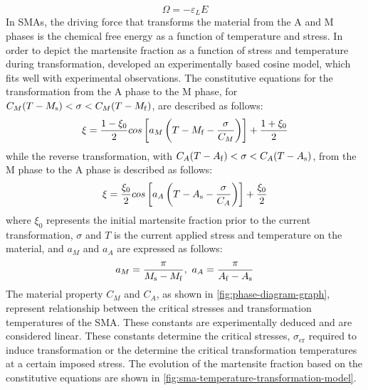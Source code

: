 \begin{equation}
  \label{eq:tensor-youngsmodulus}
  \Omega = -\varepsilon_L E
\end{equation}
In SMAs, the driving force that transforms the material from the A and M phases is the chemical free energy as a function of temperature and stress. In order to depict the martensite fraction as a function of stress and temperature during transformation, \cite{liangConstitutiveModelingShape1990a} developed an experimentally based cosine model, which fits well with experimental observations. The constitutive equations for the transformation from the A phase to the M phase, for $C_M(T-M_\mathrm{s})<\sigma<C_M(T-M_\mathrm{f})$, are described as follows:
\begin{equation}
  \label{eq:liang-MA}
  \xi=\frac{1-\xi_0}{2}cos\left[a_M\left(T-M_\mathrm{f}-\frac{\sigma}{C_M}\right)\right]+\frac{1+\xi_0}{2}
\end{equation}
while the reverse transformation, with $C_A(T-A_\mathrm{f})<\sigma<C_A(T-A_\mathrm{s})$, from the M phase to the A phase is described as follows:
\begin{equation}
  \label{eq:liang-AM}
  \xi=\frac{\xi_0}{2}cos\left[a_A\left(T-A_\mathrm{s}-\frac{\sigma}{C_A}\right)\right]+\frac{\xi_0}{2}
\end{equation}
where $\xi_0$ represents the initial martensite fraction prior to the current transformation, $\sigma$ and $T$ is the current applied stress and temperature on the material, and $a_M$ and $a_A$ are expressed as follows:
\begin{equation}
  \label{eq:aM-aA}
  a_M=\frac{\pi}{M_\mathrm{s}-M_\mathrm{f}},~a_A=\frac{\pi}{A_\mathrm{f}-A_\mathrm{s}}
\end{equation}
The material property $C_M$ and $C_A$, as shown in \cref{fig:phase-diagram-graph}, represent relationship between the critical stresses and transformation temperatures of the SMA. These constants are experimentally deduced and are considered linear. These constants determine the critical stresses, $\sigma_\mathrm{cr}$ required to induce transformation or the determine the critical transformation temperatures at a certain imposed stress. The evolution of the martensite fraction based on the constitutive equations are shown in \cref{fig:sma-temperature-transformation-model}.
